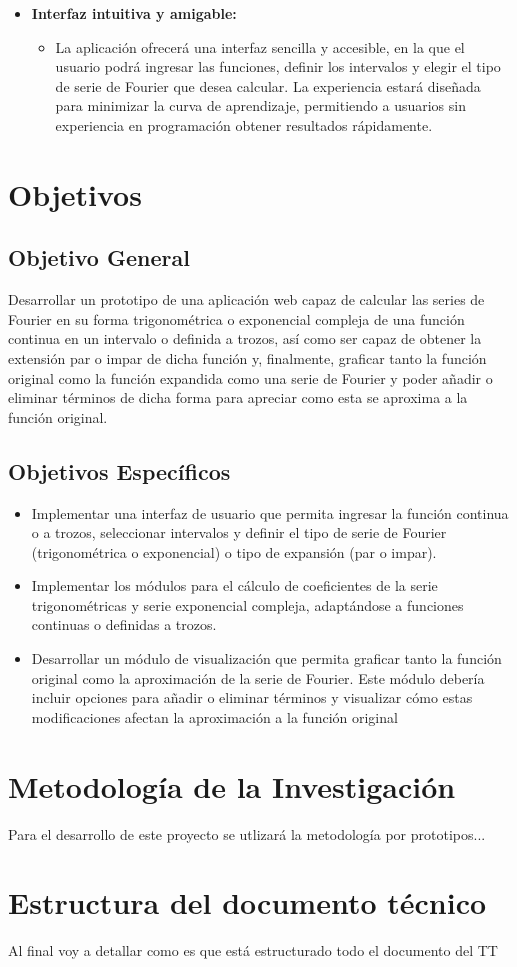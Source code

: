 \begin{itemize}
	\item \textbf{Interfaz intuitiva y amigable:}
	\vspace{-10pt}
	\begin{itemize}
		\item  La aplicación ofrecerá una interfaz sencilla y accesible, en la que el usuario podrá ingresar las funciones, definir los intervalos y elegir el tipo de serie de Fourier que desea calcular. La experiencia estará diseñada para minimizar la curva de aprendizaje, permitiendo a usuarios sin experiencia en programación obtener resultados rápidamente.
	\end{itemize}
\end{itemize}

\section{Objetivos}
\subsection{Objetivo General}
Desarrollar un prototipo de una aplicación web capaz de calcular las series de Fourier en su forma trigonométrica o exponencial compleja de una función continua en un intervalo o definida a trozos, así como ser capaz de obtener la extensión par o impar de dicha función y, finalmente, graficar tanto la función original como la función expandida como una serie de Fourier y poder añadir o eliminar términos de dicha forma para apreciar como esta se aproxima a la función original.

\subsection{Objetivos Específicos}
\begin{itemize}
	\item Implementar una interfaz de usuario que permita ingresar la función continua o a trozos, seleccionar intervalos y definir el tipo de serie de Fourier (trigonométrica o exponencial) o tipo de expansión (par o impar).
	\item Implementar los módulos para el cálculo de coeficientes de la serie trigonométricas y serie exponencial compleja, adaptándose a funciones continuas o definidas a trozos.
	\item  Desarrollar un módulo de visualización que permita graficar tanto la función original como la
	aproximación de la serie de Fourier. Este módulo debería incluir opciones para añadir o eliminar términos y visualizar cómo estas modificaciones afectan la aproximación a la función original
\end{itemize}

\section{Metodología de la Investigación}
Para el desarrollo de este proyecto se utlizará la metodología por prototipos...

\section{Estructura del documento técnico}
Al final voy a detallar como es que está estructurado todo el documento del TT

